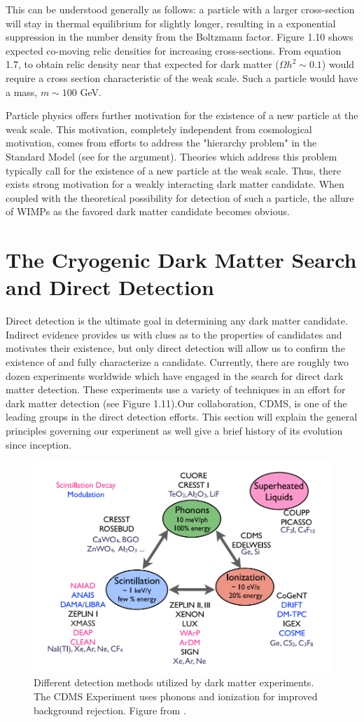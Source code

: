 \documentclass{report}
\begin{document}
This can be understood generally as follows: a particle with a larger cross-section will stay in thermal equilibrium for slightly longer, resulting in a exponential suppression in the number density from the Boltzmann factor. Figure 1.10 shows expected co-moving relic densities for increasing cross-sections. From equation 1.7, to obtain relic density near that expected for dark matter ($\Omega h^2 \sim 0.1$) would require a cross section characteristic of the weak scale. Such a particle would have a mass, $m \sim 100 $ GeV.

Particle physics offers further motivation for the existence of a new particle at the weak scale. This motivation, completely independent from cosmological motivation, comes from efforts to address the "hierarchy problem" in the Standard Model (see \cite{Filippini2008} for the argument). Theories which address this problem typically call for the existence of a new particle at the weak scale. Thus, there exists strong motivation for a weakly interacting dark matter candidate. When coupled with the theoretical possibility for detection of such a particle, the allure of WIMPs as the favored dark matter candidate becomes obvious.

\section{The Cryogenic Dark Matter Search and Direct Detection}

Direct detection is the ultimate goal in determining any dark matter candidate. Indirect evidence provides us with clues as to the properties of candidates and motivates their existence, but only direct detection will allow us to confirm the existence of and fully characterize a candidate. Currently, there are roughly two dozen experiments worldwide which have engaged in the search for direct dark matter detection. These experiments use a variety of techniques in an effort for dark matter detection (see Figure 1.11).Our collaboration, CDMS, is one of the leading groups in the direct detection efforts. This section will explain the general principles governing our experiment as well give a brief history of its evolution since inception.

\begin{figure}[h]
\centering
\includegraphics[width = .5\textwidth]{Dm_experiments.png}
\caption{Different detection methods utilized by dark matter experiments. The CDMS Experiment uses phonons and ionization for improved background rejection. Figure from \cite{Figueroa2011}.}
\end{figure}
\end{document}

